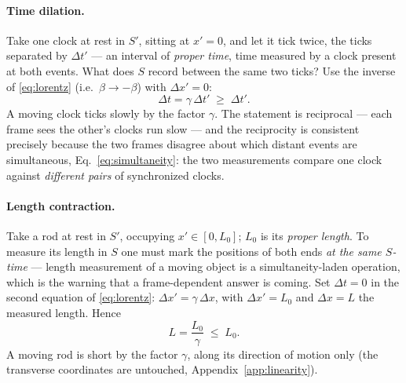 \documentclass[11pt]{article}
\theoremstyle{plain}
\theoremstyle{definition}
\theoremstyle{remark}
\begin{document}
\paragraph{Time dilation.} Take one clock at rest in $S'$, sitting at
$x' = 0$, and let it tick twice, the ticks separated by $\Delta t'$ ---
an interval of \emph{proper time}, time measured by a clock present at
both events. What does $S$ record between the same two ticks? Use the
inverse of \eqref{eq:lorentz} (i.e.\ $\beta \to -\beta$) with
$\Delta x' = 0$:
\begin{equation}
  \boxed{\;
  \Delta t = \gamma\,\Delta t' \;\ge\; \Delta t' .
  \;}
  \label{eq:time-dilation}
\end{equation}
A moving clock ticks slowly by the factor $\gamma$. The statement is
reciprocal --- each frame sees the other's clocks run slow --- and the
reciprocity is consistent precisely because the two frames disagree about
which distant events are simultaneous, Eq.~\eqref{eq:simultaneity}: the
two measurements compare one clock against \emph{different pairs} of
synchronized clocks.

\paragraph{Length contraction.} Take a rod at rest in $S'$, occupying
$x' \in [0, L_0]$; $L_0$ is its \emph{proper length}. To measure its
length in $S$ one must mark the positions of both ends \emph{at the same
$S$-time} --- length measurement of a moving object is a
simultaneity-laden operation, which is the warning that a frame-dependent
answer is coming. Set $\Delta t = 0$ in the second equation of
\eqref{eq:lorentz}: $\Delta x' = \gamma\,\Delta x$, with
$\Delta x' = L_0$ and $\Delta x = L$ the measured length. Hence
\begin{equation}
  \boxed{\;
  L = \frac{L_0}{\gamma} \;\le\; L_0 .
  \;}
  \label{eq:length-contraction}
\end{equation}
A moving rod is short by the factor $\gamma$, along its direction of
motion only (the transverse coordinates are untouched,
Appendix~\ref{app:linearity}).
\end{document}

